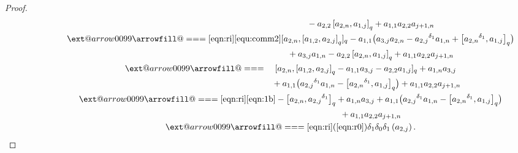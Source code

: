 \documentclass[10pt,a4paper]{amsart}
\makeatletter
\def\x@arrow{\DOTSB\Relbar}
\def\xlongequalsignfill@{\arrowfill@\x@arrow\Relbar\x@arrow}
\providecommand{\xlongequal}[2][]{%
	\ext@arrow 0099\xlongequalsignfill@{#1}{#2}}
\numberwithin{equation}{section}
\def\lr#1{\left[#1\right]}
\def\lrb#1{\left(#1\right)}
\def\d{\delta}
\makeatother
\begin{document}
\begin{proof}
\begin{gather*}
 \phantom{ \d_0\d_1\d_0\lrb{a_{2,j}} \xlongequal{\qquad}}{} -a_{2,2}\lr{a_{2,n}, a_{1,j}}_q+a_{1,1}a_{2,2}a_{j+1,n}\\
 \phantom{ \d_0\d_1\d_0\lrb{a_{2,j}}}{} \xlongequal[\eqref{eqn:ri}]{\eqref{equ:comm2}} [a_{2,n},\lr{a_{1,2}, a_{2,j}}_q]_q -a_{1,1}\bigl(a_{3,j}a_{2,n} - {a_{2,j}}^{\d_1}a_{1,n}+\bigl[ {a_{2,n}}^{\d_1}, a_{1,j}\bigr]_q\bigr) \\
 \phantom{ \d_0\d_1\d_0\lrb{a_{2,j}}\xlongequal{\qquad}}{} +a_{3,j}a_{1,n}-a_{2,2}\lr{a_{2,n}, a_{1,j}}_q +a_{1,1}a_{2,2}a_{j+1,n}\\
 \phantom{ \d_0\d_1\d_0\lrb{a_{2,j}}}{} \xlongequal{\quad} [a_{2,n},\lr{a_{1,2}, a_{2,j}}_q -a_{1,1}a_{3,j} -a_{2,2}a_{1,j}]_q+a_{1,n}a_{3,j} \\
 \phantom{ \d_0\d_1\d_0\lrb{a_{2,j}} \xlongequal{\quad} }{} +a_{1,1} \bigl({a_{2,j}}^{\d_1}a_{1,n} - \bigl[ {a_{2,n}}^{\d_1}, a_{1,j}\bigr]_q\bigr)+a_{1,1}a_{2,2}a_{j+1,n}\\
 \phantom{ \d_0\d_1\d_0\lrb{a_{2,j}}}{} \xlongequal[\eqref{eqn:ri}]{\eqref{eqn:1b}} -\bigl[a_{2,n} , {a_{2,j}}^{\d_1}\bigr]_q+a_{1,n}a_{3,j} +a_{1,1} \bigl({a_{2,j}}^{\d_1}a_{1,n}-\bigl[ {a_{2,n}}^{\d_1}, a_{1,j}\bigr]_q\bigr)\\
 \phantom{ \d_0\d_1\d_0\lrb{a_{2,j}} \xlongequal{\qquad} }{} +a_{1,1}a_{2,2}a_{j+1,n}\\
 \phantom{ \d_0\d_1\d_0\lrb{a_{2,j}}}{} \xlongequal[\eqref{eqn:ri}]{\lrb{\ref{eqn:r0}}} \d_1\d_0\d_1\lrb{a_{2,j}}.
\end{gather*}


\end{proof}
\end{document}
